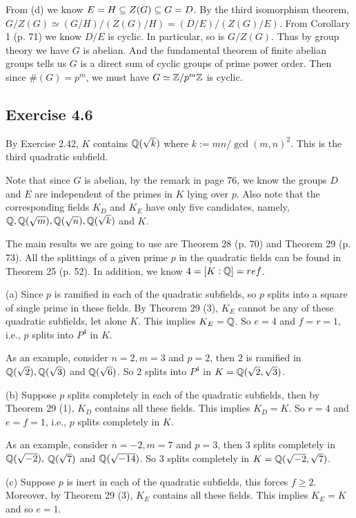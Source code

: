 \documentclass[../Marcus.tex]{subfiles}
\begin{document}
From (d) we know $E=H\subseteq Z(G)\subseteq G=D$. By the third isomorphism theorem, $G/Z(G) \simeq (G/H)/(Z(G)/H) = (D/E)/(Z(G)/E)$. From Corollary 1 (p. 71) we know  $D/E$ is cyclic. In particular, so is $G/Z(G)$. Thus by group theory we have $G$ is abelian. And the fundamental theorem of finite abelian groups tells us $G$ is a direct sum of cyclic groups of prime power order. Then since $\#(G)=p^m$, we must have $G\simeq \mathbb{Z}/p^m\mathbb{Z}$ is cyclic.

\subsection*{Exercise 4.6}

By Exercise 2.42, $K$ contains $\mathbb{Q}(\sqrt{k})$ where $k:=mn/\gcd(m,n)^2$. This is the third quadratic subfield.

Note that since $G$ is abelian, by the remark in page 76, we know the groups $D$ and $E$ are independent of the primes in $K$ lying over $p$. Also note that the corresponding fields $K_D$ and $K_E$ have only five candidates, namely, $\mathbb{Q},\mathbb{Q}(\sqrt{m}),\mathbb{Q}(\sqrt{n}),\mathbb{Q}(\sqrt{k})$ and $K$.

The main results we are going to use are Theorem 28 (p. 70) and Theorem 29 (p. 73). All the splittings of a given prime $p$ in the quadratic fields can be found in Theorem 25 (p. 52). In addition, we know $4=[K:\mathbb{Q}]=ref$.

(a) Since $p$ is ramified in each of the quadratic subfields, so $p$ splits into a square of single prime in these fields. By Theorem 29 (3), $K_E$ cannot be any of these quadratic subfields, let alone $K$. This implies $K_E=\mathbb{Q}$. So $e=4$ and $f=r=1$, i.e., $p$ splits into $P^4$ in $K$.

As an example, consider $n=2,m=3$ and $p=2$, then $2$ is ramified in $\mathbb{Q}(\sqrt{2}),\mathbb{Q}(\sqrt{3})$ and $\mathbb{Q}(\sqrt{6})$. So $2$ splits into $P^4$ in $K=\mathbb{Q}(\sqrt{2},\sqrt{3})$.

(b) Suppose $p$ splits completely in each of the quadratic subfields, then by Theorem 29 (1), $K_D$ contains all these fields. This implies $K_D=K$. So $r=4$ and $e=f=1$, i.e., $p$ splits completely in $K$.

As an example, consider $n=-2,m=7$ and $p=3$, then $3$ splits completely in $\mathbb{Q}(\sqrt{-2}),$ $\mathbb{Q}(\sqrt{7})$ and $\mathbb{Q}(\sqrt{-14})$. So $3$ splits completely in $K=\mathbb{Q}(\sqrt{-2},\sqrt{7})$.

(c) Suppose $p$ is inert in each of the quadratic subfields, this forces $f\geq 2$. Moreover, by Theorem 29 (3), $K_E$ contains all these fields. This implies $K_E=K$ and so $e=1$.
\end{document}
